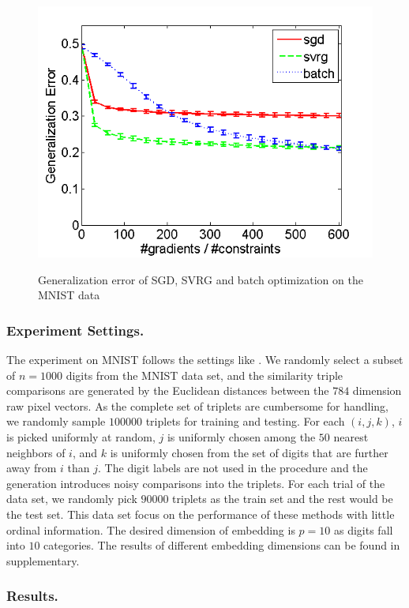 \documentclass[letterpaper]{article}
\begin{document}
\begin{figure}
{				\includegraphics[scale=0.33]{MNIST_TSTE_200_test.png}
			}
			\caption{Generalization error of SGD, SVRG and batch optimization on the MNIST data}
			\label{fig:2} %
		\end{figure}

		\subsubsection{Experiment Settings.}
		The experiment on MNIST follows the settings like \cite{vandermaaten2012stochastic}. We randomly select a subset of $n=1000$ digits from the MNIST data set, and the similarity triple comparisons are generated by the Euclidean distances between the $784$ dimension raw pixel vectors. As the complete set of triplets are cumbersome for handling, we randomly sample $100000$ triplets for training and testing. For each $(i, j, k)$, $i$ is picked uniformly at random, $j$ is uniformly chosen among the $50$ nearest neighbors of $i$, and $k$ is uniformly chosen from the set of digits that are further away from $i$ than $j$. The digit labels are not used in the procedure and the generation introduces noisy comparisons into the triplets. For each trial of the data set, we randomly pick $90000$ triplets as the train set and the rest would be the test set. This data set focus on the performance of these methods with little ordinal information. The desired dimension of embedding is $p = 10$ as digits fall into $10$ categories. The results of different embedding dimensions can be found in supplementary.

		\subsubsection{Results.}
\end{document}
